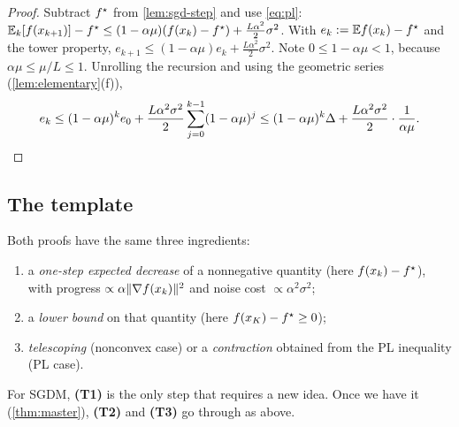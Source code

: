 \begin{proof}
Subtract $f^\star$ from \cref{lem:sgd-step} and use \eqref{eq:pl}:
$\mathbb{E}_k[f(x_{k+1})]-f^\star\le(1-\alpha\mu)(f(x_k)-f^\star)+\frac{L\alpha^2}{2}\sigma^2$. With
$e_k:=\mathbb{E} f(x_k)-f^\star$ and the tower property, $e_{k+1}\le(1-\alpha\mu)e_k+\frac{L\alpha^2}2\sigma^2$.
Note $0\le1-\alpha\mu<1$, because $\alpha\mu\le\mu/L\le1$.
Unrolling the recursion and using the geometric series (\cref{lem:elementary}(f)),
\[
  e_k\le(1-\alpha\mu)^ke_0+\frac{L\alpha^2\sigma^2}{2}\sum_{j=0}^{k-1}(1-\alpha\mu)^j
  \le(1-\alpha\mu)^k\Delta+\frac{L\alpha^2\sigma^2}{2}\cdot\frac1{\alpha\mu}. \qedhere
\]
\end{proof}

\subsection{The template}\label{sec:template}

Both proofs have the same three ingredients:
\begin{enumerate}[label=\textbf{(T\arabic*)}]
\item a \emph{one-step expected decrease} of a nonnegative quantity (here $f(x_k)-f^\star$),
      with progress $\propto\alpha\lVert \nabla f(x_k)\rVert^2$ and noise cost $\propto\alpha^2\sigma^2$;
\item a \emph{lower bound} on that quantity (here $f(x_K)-f^\star\ge0$);
\item \emph{telescoping} (nonconvex case) or a \emph{contraction} obtained from the PL
      inequality (PL case).
\end{enumerate}
For SGDM, \textbf{(T1)} is the only step that requires a new idea. Once we have it
(\cref{thm:master}), \textbf{(T2)} and \textbf{(T3)} go through as above.
